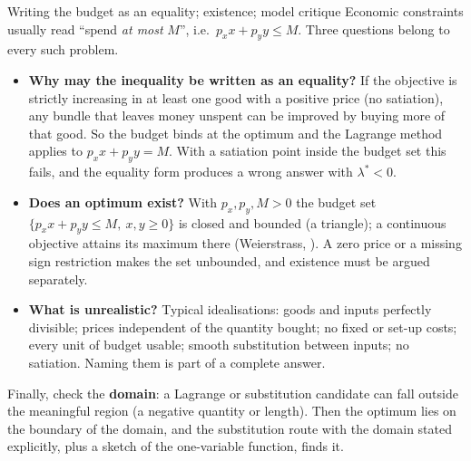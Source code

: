 \begin{rulebox}{Writing the budget as an equality; existence; model critique}
Economic constraints usually read ``spend \emph{at most} $M$'', i.e.\
$p_xx+p_yy\le M$. Three questions belong to every such problem.
\begin{itemize}[leftmargin=1.6em,itemsep=0.3ex]
  \item \textbf{Why may the inequality be written as an equality?} If the
        objective is strictly increasing in at least one good with a
        positive price (no satiation), any bundle that leaves money unspent
        can be improved by buying more of that good. So the budget binds at
        the optimum and the Lagrange method applies to $p_xx+p_yy=M$. With
        a satiation point inside the budget set this fails, and the
        equality form produces a wrong answer with $\lambda^*<0$.
  \item \textbf{Does an optimum exist?} With $p_x,p_y,M>0$ the budget set
        $\{p_xx+p_yy\le M,\ x,y\ge0\}$ is closed and bounded (a triangle);
        a continuous objective attains its maximum there (Weierstrass,
        \chref{optimization}{1}). A zero price or a missing sign restriction makes the
        set unbounded, and existence must be argued separately.
  \item \textbf{What is unrealistic?} Typical idealisations: goods and
        inputs perfectly divisible; prices independent of the quantity
        bought; no fixed or set-up costs; every unit of budget usable;
        smooth substitution between inputs; no satiation. Naming them is
        part of a complete answer.
\end{itemize}
Finally, check the \textbf{domain}: a Lagrange or substitution candidate
can fall outside the meaningful region (a negative quantity or length).
Then the optimum lies on the boundary of the domain, and the substitution
route with the domain stated explicitly, plus a sketch of the
one-variable function, finds it.
\end{rulebox}

